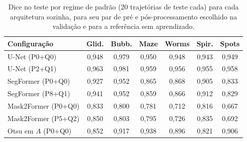 \begin{table}[t]
\centering
\caption{Dice no teste por regime de padrão (20 trajetórias de teste cada) para cada arquitetura sozinha, para seu par de pré e pós-processamento escolhido na validação e para a referência sem aprendizado.}
\label{tab:regime}
\scriptsize
\setlength{\tabcolsep}{2.5pt}
\begin{tabularx}{\columnwidth}{Y *{6}{c}}
\toprule
\textbf{Configuração} & \textbf{Glid.} & \textbf{Bubb.} & \textbf{Maze} & \textbf{Worms} & \textbf{Spir.} & \textbf{Spots} \\
\midrule
U-Net (P0+Q0) & 0,948 & 0,979 & 0,950 & 0,948 & 0,943 & 0,949 \\
U-Net (P2+Q1) & 0,963 & 0,981 & 0,959 & 0,956 & 0,955 & 0,958 \\
SegFormer (P0+Q0) & 0,927 & 0,952 & 0,865 & 0,868 & 0,905 & 0,833 \\
SegFormer (P8+Q1) & 0,941 & 0,952 & 0,859 & 0,866 & 0,912 & 0,829 \\
Mask2Former (P0+Q0) & 0,833 & 0,800 & 0,781 & 0,712 & 0,816 & 0,667 \\
Mask2Former (P5+Q2) & 0,850 & 0,803 & 0,795 & 0,726 & 0,835 & 0,692 \\
Otsu em $A$ (P0+Q0) & 0,852 & 0,917 & 0,938 & 0,896 & 0,821 & 0,906 \\
\bottomrule
\end{tabularx}
\end{table}
